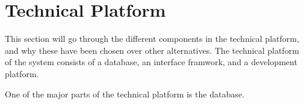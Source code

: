 \section{Technical Platform} \label{sc:tech_intro}
This section will go through the different components in the technical platform, and why these have been chosen over other alternatives. The technical platform of the system consists of a database, an interface framwork, and a development platform.
\par
One of the major parts of the technical platform is the database.